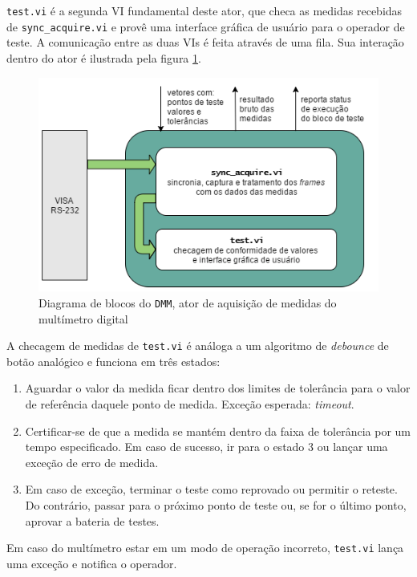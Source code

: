             \texttt{test.vi} é a segunda VI fundamental deste ator, que checa as medidas recebidas de \texttt{sync\_acquire.vi} e provê uma interface gráfica de usuário para o operador de teste. A comunicação entre as duas VIs é feita através de uma fila. Sua interação dentro do ator é ilustrada pela figura \ref{fig:diagdmm}.
            
            \begin{figure}
                \centering
                \includegraphics[width=0.9\linewidth]{fig/diag/diagdmm.png}
                \caption{Diagrama de blocos do \texttt{DMM}, ator de aquisição de medidas do multímetro digital}
                \label{fig:diagdmm}
            \end{figure}
            
            A checagem de medidas de \texttt{test.vi} é análoga a um algoritmo de \textit{debounce} de botão analógico e funciona em três estados:
            \begin{enumerate}
                \item Aguardar o valor da medida ficar dentro dos limites de tolerância para o valor de referência daquele ponto de medida. Exceção esperada: \textit{timeout}.
                \item Certificar-se de que a medida se mantém dentro da faixa de tolerância por um tempo especificado. Em caso de sucesso, ir para o estado 3 ou lançar uma exceção de erro de medida.
                \item Em caso de exceção, terminar o teste como reprovado ou permitir o reteste. Do contrário, passar para o próximo ponto de teste ou, se for o último ponto, aprovar a bateria de testes.
            \end{enumerate}

            Em caso do multímetro estar em um modo de operação incorreto, \texttt{test.vi} lança uma exceção e notifica o operador.  
            

